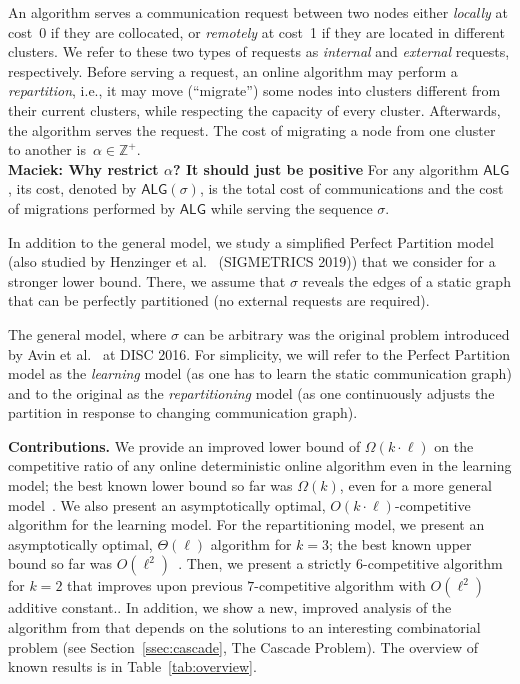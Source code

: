 \documentclass[manuscript,screen=true, review, anonymous]{acmart}
\newcommand{\ALG}{\textsf{ALG}\xspace}
\newcommand\maciek[1]{\color{brown}\textbf{\\ Maciek: #1}\color{black}}
\begin{document}
An algorithm serves a communication request between two nodes
either \emph{locally} at cost~0
if they are collocated,
or \emph{remotely} at cost~1
if they are located in different clusters.
We refer to these two types of requests as \emph{internal}
and \emph{external} requests, respectively.
Before serving a request,
an online algorithm may perform a \emph{repartition},
i.e.,
it may move (``migrate'') some nodes into clusters different from their current clusters, while respecting the capacity of every cluster. 
Afterwards, 
the algorithm serves the  request.
The cost of migrating a node from one cluster to another
is~$\alpha \in \mathbb{Z}^+$.
\maciek{Why restrict $\alpha$? It should just be positive}
For any algorithm $\ALG$,
its cost,
denoted by $\ALG(\sigma)$,
is the total cost of communications and
the cost of migrations performed by $\ALG$ while serving the sequence $\sigma$.

In addition to the general model, we study a simplified Perfect Partition model (also studied by Henzinger et al.~\cite{sigmetrics19_partitioning} (SIGMETRICS 2019)) that we consider for a stronger lower bound.
There, we assume that $\sigma$
reveals the edges of a static graph
that can be perfectly partitioned
(no external requests are required). 

The general model, where $\sigma$ can be arbitrary
was the original problem introduced
by Avin et al.~\cite{repartition-disc} at DISC 2016.
For simplicity, we will refer to the Perfect Partition
model as the \emph{learning} model (as
one has to learn the static communication graph) 
and to the original as the \emph{repartitioning} model (as one continuously adjusts the partition in response to changing communication graph).


\noindent \textbf{Contributions.}
We provide an improved lower bound 
of $\Omega(k\cdot\ell)$ on the competitive ratio of any online deterministic online algorithm 
even in the learning model;
the best known lower bound so far was $\Omega(k)$,
even for a more general model~\cite{repartition-disc}.
We also present an asymptotically optimal, 
$O(k\cdot \ell)$-competitive algorithm
for the learning model.
For the repartitioning model, we present  
an asymptotically optimal,
$\Theta(\ell)$ algorithm for $k=3$;
the best known upper bound 
so far was $O(\ell^2)$~\cite{repartition-disc}.
Then, we present a strictly $6$-competitive algorithm for $k=2$ that improves upon previous $7$-competitive algorithm with $O(\ell^2)$ additive constant..
In addition, we show a new, improved analysis of the algorithm from \cite{repartition-disc} that depends on the solutions to an interesting combinatorial problem (see Section~\ref{ssec:cascade}, The Cascade Problem).
%
The overview of known results is in Table~\ref{tab:overview}.
\end{document}

